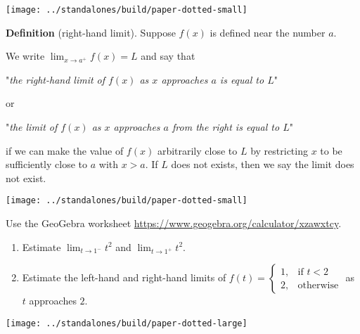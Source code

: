 \documentclass[../main.tex]{subfiles}
\begin{document}
\texttt{[image: ../standalones/build/paper-dotted-small]}

\begin{mdframed}[style=withref]
  \textbf{Definition} (right-hand limit). Suppose \(f(x)\) is defined {near} the number \(a\).

  We write \({\lim_{x \to a^{+}} f(x)} = L\) and say that
  \begin{center}
    "\emph{the {right-hand limit} of \(f(x)\) as \(x\) {approaches} \(a\) is equal to \(L\)}"
  \end{center}
  or
  \begin{center}
    "\emph{the {limit} of \(f(x)\) as \(x\) {approaches} \(a\) {from the right} is equal to \(L\)}"
  \end{center}
  if we can make the value of \(f(x)\) {arbitrarily} close to \(L\) by {restricting} \(x\) to be {sufficiently close} to \(a\) with {\(x > a\)}. If \(L\) does not exists, then we say the limit does not exist.

\end{mdframed}
\texttt{[image: ../standalones/build/paper-dotted-small]}

\begin{example} \label{activity:one-sided}
  Use the GeoGebra worksheet \url{https://www.geogebra.org/calculator/xzawxtcy}.
  \begin{enumerate}[label=(\alph*)]
    \item Estimate \(\lim_{t \to 1^{-}} t^{2}\) and \(\lim_{t \to 1^{+}} t^{2}\).
          \vfill{}

    \item \label{part:piecewise} Estimate the left-hand and right-hand limits of \(f(t) =
          \begin{cases}
            1, & \text{if } t < 2 \\
            2, & \text{otherwise}
          \end{cases}\) as \(t\) approaches \(2\).
          \vfill{}
  \end{enumerate}
\end{example}

\texttt{[image: ../standalones/build/paper-dotted-large]}
\end{document}
